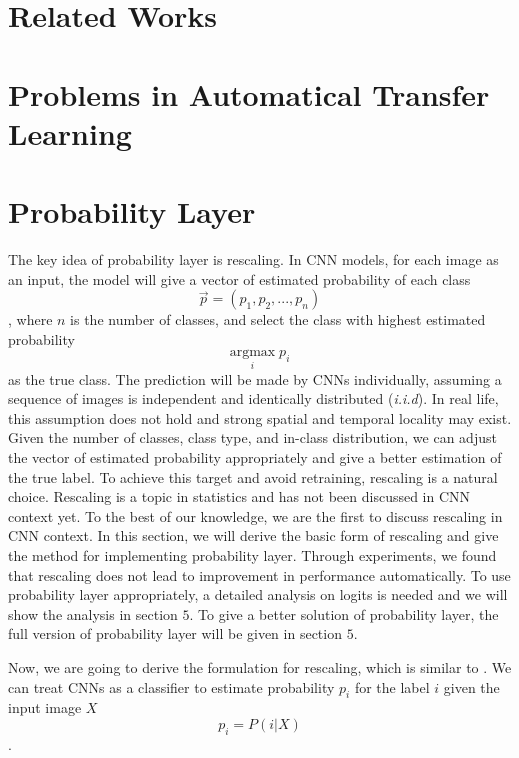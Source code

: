\documentclass{article}
\begin{document}
\section{Related Works}



\section{Problems in Automatical Transfer Learning}




\section{Probability Layer}
The key idea of probability layer is rescaling. In CNN models, for each image as an input, the model will give a vector of estimated probability of each class 
\begin{equation}
    \vec{p} = (p_1, p_2, ..., p_n)
\end{equation}
, where $n$ is the number of classes, and select the class with highest estimated probability 
\begin{equation}
    \underset{i}{\text{argmax}} \; p_i
\end{equation}
as the true class. The prediction will be made by CNNs individually, assuming a sequence of images is independent and identically distributed (\textit{i.i.d}). In real life, this assumption does not hold and strong spatial and temporal locality may exist. Given the number of classes, class type, and in-class distribution, we can adjust the vector of estimated probability appropriately and give a better estimation of the true label. To achieve this target and avoid retraining, rescaling is a natural choice. Rescaling is a topic in statistics \cite{saerens2002adjusting} and has not been discussed in CNN context yet. To the best of our knowledge, we are the first to discuss rescaling in CNN context. In this section, we will derive the basic form of rescaling and give the method for implementing probability layer. Through experiments, we found that rescaling does not lead to improvement in performance automatically. To use probability layer appropriately, a detailed analysis on logits is needed and we will show the analysis in section $5$. To give a better solution of probability layer, the full version of probability layer will be given in section $5$.

Now, we are going to derive the formulation for rescaling, which is similar to \cite{saerens2002adjusting}. We can treat CNNs as a classifier to estimate probability $p_i$ for the label $i$ given the input image $X$
\begin{equation}
    p_i = P(i|X)
\end{equation}. 
\end{document}
